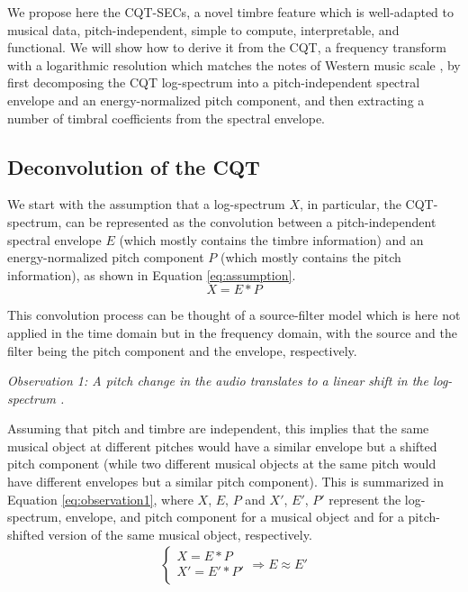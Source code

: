 \documentclass[journal]{IEEEtran}
\begin{document}
We propose here the CQT-SECs, a novel timbre feature which is well-adapted to musical data, pitch-independent, simple to compute, interpretable, and functional. We will show how to derive it from the CQT, a frequency transform with a logarithmic resolution which matches the notes of Western music scale \cite{brown1991, brown1992}, by first decomposing the CQT log-spectrum into a pitch-independent spectral envelope and an energy-normalized pitch component, and then extracting a number of timbral coefficients from the spectral envelope. 

\subsection{Deconvolution of the CQT}

We start with the assumption that a log-spectrum $X$, in particular, the CQT-spectrum, can be represented as the convolution between a pitch-independent spectral envelope $E$ (which mostly contains the timbre information) and an energy-normalized pitch component $P$ (which mostly contains the pitch information), as shown in Equation \ref{eq:assumption}. 
\begin{equation}
\label{eq:assumption}
X = E * P
\end{equation}

This convolution process can be thought of a source-filter model \cite{fant1970} which is here not applied in the time domain but in the frequency domain, with the source and the filter being the pitch component and the envelope, respectively.

\emph{Observation 1: A pitch change in the audio translates to a linear shift in the log-spectrum \cite{brown1991, brown1992}.}

Assuming that pitch and timbre are independent, this implies that the same musical object at different pitches would have a similar envelope but a shifted pitch component (while two different musical objects at the same pitch would have different envelopes but a similar pitch component). This is summarized in Equation \ref{eq:observation1}, where $X$, $E$, $P$ and $X'$, $E'$, $P'$ represent the log-spectrum, envelope, and pitch component for a musical object and for a pitch-shifted version of the same musical object, respectively.
\begin{equation}
\label{eq:observation1}
\begin{split}
\begin{cases}
X = E * P \\
X' = E' * P' \\
\end{cases}
\Rightarrow E \approx E'
\end{split}
\end{equation}
\end{document}
